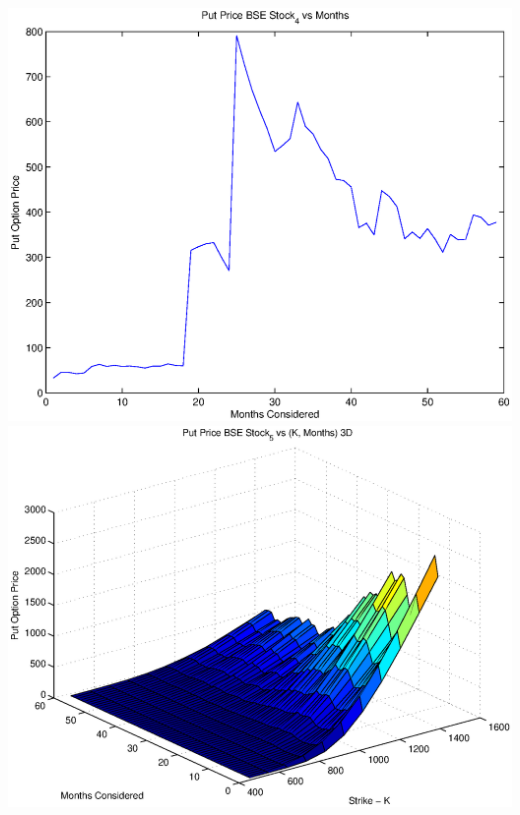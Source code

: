 \documentclass{article}
\begin{document}
\includegraphics[width=\textwidth]{Put_Price_BSE_Stock_4_vs_Months} \\

\includegraphics[width=\textwidth]{Put_Price_BSE_Stock_5_vs_(K,_Months)_3D} \\
\end{document}
